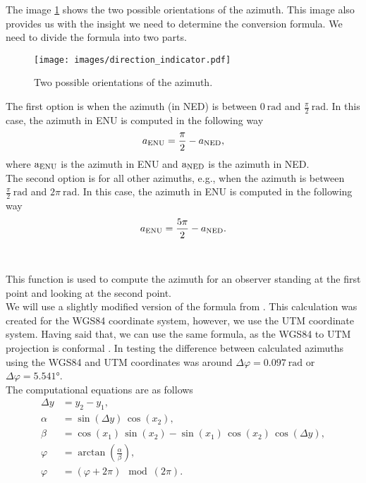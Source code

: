             The image \ref{fig:dir_indi} shows the two possible orientations of the azimuth. This image also provides us with the insight we need to determine the conversion formula. We need to divide the formula into two parts.\\
            \begin{figure}[ht]
                \centering
                \texttt{[image: images/direction\_indicator.pdf]}
                \caption{Two possible orientations of the azimuth.}
                \label{fig:dir_indi}
            \end{figure}
            \noindent The first option is when the azimuth (in NED) is between $0\:\si{\radian}$ and $\frac{\pi}{2}\:\si{\radian}$. In this case, the azimuth in ENU is computed in the following way
            \begin{equation}
                a_{\rm{ENU}} = \frac{\pi}{2} - a_{\rm{NED}},
            \end{equation}
            where $\text{a}_{\rm{ENU}}$ is the azimuth in ENU and $\text{a}_{\rm{NED}}$ is the azimuth in NED.\\
            The second option is for all other azimuths, e.g., when the azimuth is between $\frac{\pi}{2}\:\si{\radian}$ and $2\pi\:\si{\radian}$. In this case, the azimuth in ENU is computed in the following way
            \begin{equation}
                a_{\rm{ENU}} = \frac{5\pi}{2} - a_{\rm{NED}}.
            \end{equation}\\
        \\
            This function is used to compute the azimuth for an observer standing at the first point and looking at the second point.\\
            We will use a slightly modified version of the formula from \cite{calc_bearing}. This calculation was created for the WGS84 coordinate system, however, we use the UTM coordinate system. Having said that, we can use the same formula, as the WGS84 to UTM projection is conformal \cite{Map_projections}. In testing the difference between calculated azimuths using the WGS84 and UTM coordinates was around $\Delta\varphi=0.097\:\si{\radian}$ or $\Delta\varphi=5.541\si{\degree}$.\\
            The computational equations are as follows
            \begin{align}
                \Delta y &= y_{2} - y_{1}, \\
                \alpha &= \sin{(\Delta y)}\,\cos{(x_{2})}, \\
                \beta &= \cos{(x_{1})}\,\sin{(x_{2})} - \sin{(x_{1})}\,\cos{(x_{2})}\,\cos{(\Delta y)}, \\
                \varphi &= \arctan{\left(\frac{\alpha}{\beta}\right)}, \\
                \varphi &= (\varphi + 2\pi) \mod (2\pi).
            \end{align}
